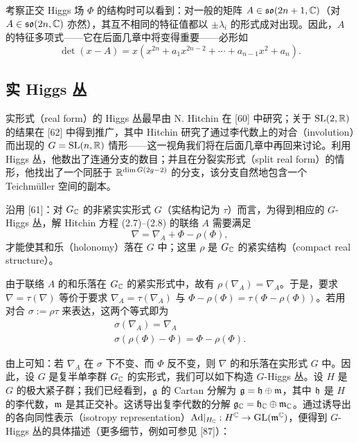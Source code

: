 
考察正交 Higgs 场 $\Phi$ 的结构时可以看到：对一般的矩阵 $A\in\mathfrak{so}(2n+1,\mathbb{C})$（对 $A\in\mathfrak{so}(2n,\mathbb{C})$ 亦然），其互不相同的特征值都以 $\pm\lambda_i$ 的形式成对出现。因此，$A$ 的特征多项式——它在后面几章中将变得重要——必形如
\[
\det(x-A)=x(x^{2n}+a_1x^{2n-2}+\cdots+a_{n-1}x^{2}+a_n).
\]


\subsection{实 Higgs 丛}

实形式（real form）的 Higgs 丛最早由 N. Hitchin 在 [60] 中研究；关于 $\mathrm{SL}(2,\mathbb{R})$ 的结果在 [62] 中得到推广，其中 Hitchin 研究了通过李代数上的对合（involution）而出现的 $G=\mathrm{SL}(n,\mathbb{R})$ 情形——这一视角我们将在后面几章中再回来讨论。利用 Higgs 丛，他数出了连通分支的数目；并且在分裂实形式（split real form）的情形，他找出了一个同胚于 $\mathbb{R}^{\dim G(2g-2)}$ 的分支，该分支自然地包含一个 Teichmüller 空间的副本。

沿用 [61]：对 $G_{\mathbb{C}}$ 的非紧实实形式 $G$（实结构记为 $\tau$）而言，为得到相应的 $G$-Higgs 丛，解 Hitchin 方程 (2.7)--(2.8) 的联络 $A$ 需要满足
\[
\nabla=\nabla_A+\Phi-\rho(\Phi),
\]
才能使其和乐（holonomy）落在 $G$ 中；这里 $\rho$ 是 $G_{\mathbb{C}}$ 的紧实结构（compact real structure）。

由于联络 $A$ 的和乐落在 $G_{\mathbb{C}}$ 的紧实形式中，故有 $\rho(\nabla_A)=\nabla_A$。于是，要求 $\nabla=\tau(\nabla)$ 等价于要求 $\nabla_A=\tau(\nabla_A)$ 与 $\Phi-\rho(\Phi)=\tau(\Phi-\rho(\Phi))$。若用对合 $\sigma:=\rho\tau$ 来表达，这两个等式即为
\begin{gather*}
\sigma(\nabla_A)=\nabla_A\\
\sigma(\rho(\Phi)-\Phi)=\Phi-\rho(\Phi).
\end{gather*}

由上可知：若 $\nabla_A$ 在 $\sigma$ 下不变、而 $\Phi$ 反不变，则 $\nabla$ 的和乐落在实形式 $G$ 中。因此，设 $G$ 是复半单李群 $G_{\mathbb{C}}$ 的实形式，我们可以如下构造 $G$-Higgs 丛。设 $H$ 是 $G$ 的极大紧子群；我们已经看到，$\mathfrak{g}$ 的 Cartan 分解为 $\mathfrak{g}=\mathfrak{h}\oplus\mathfrak{m}$，其中 $\mathfrak{h}$ 是 $H$ 的李代数，$\mathfrak{m}$ 是其正交补。这诱导出复李代数的分解 $\mathfrak{g}_{\mathbb{C}}=\mathfrak{h}_{\mathbb{C}}\oplus\mathfrak{m}_{\mathbb{C}}$。通过诱导出的各向同性表示（isotropy representation）$\mathrm{Ad}|_{H_{\mathbb{C}}}:H^{\mathbb{C}}\to\mathrm{GL}(\mathfrak{m}^{\mathbb{C}})$，便得到 $G$-Higgs 丛的具体描述（更多细节，例如可参见 [87]）：

